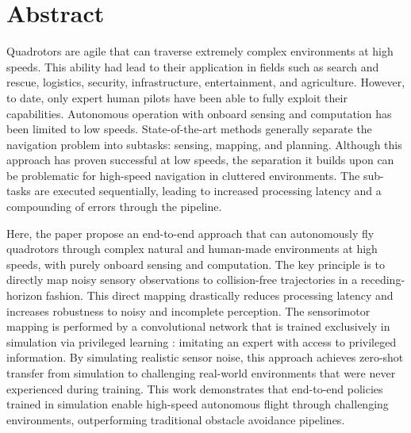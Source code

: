 \chapter*{Abstract}
Quadrotors are agile that can traverse extremely complex environments at high
speeds. This ability had lead to their application in fields such as search and rescue, logistics, security, infrastructure, entertainment, and agriculture.  However, to date, only expert human pilots have been able to fully exploit their capabilities. Autonomous operation with onboard sensing and computation has been limited to low speeds. State-of-the-art methods generally
separate the navigation problem into subtasks: sensing, mapping, and planning. Although this approach has
proven successful at low speeds, the separation it builds upon can be problematic for high-speed navigation in
cluttered environments. The sub-tasks are executed sequentially, leading to increased processing latency and a
compounding of errors through the pipeline.

Here, the paper \autocite{high-speed-flight} propose an end-to-end approach that can autonomously fly quadrotors through complex natural and human-made environments at high speeds, with purely onboard sensing and computation. The key principle is to directly map noisy sensory observations to collision-free trajectories in a receding-horizon \cite{receding_horizon} fashion. This direct mapping drastically reduces processing latency and increases
robustness to noisy and incomplete perception. The sensorimotor mapping is performed by a convolutional network that is trained exclusively in simulation via privileged learning : imitating an expert with access to privileged information. By simulating realistic sensor noise, this approach achieves zero-shot transfer from simulation to
challenging real-world environments that were never experienced during training. This work demonstrates that end-to-end policies trained in
simulation enable high-speed autonomous flight through challenging environments, outperforming traditional
obstacle avoidance pipelines.
